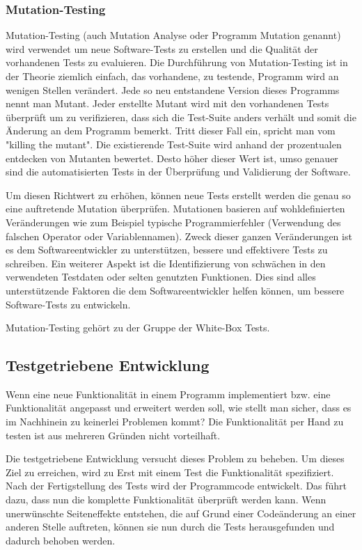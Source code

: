 \subsubsection{Mutation-Testing}

Mutation-Testing (auch Mutation Analyse oder Programm Mutation genannt) wird verwendet um neue Software-Tests zu erstellen und die Qualität der vorhandenen Tests zu evaluieren. Die Durchführung von Mutation-Testing ist in der Theorie ziemlich einfach, das vorhandene, zu testende, Programm wird an wenigen Stellen verändert. Jede so neu entstandene Version dieses Programms nennt man Mutant. Jeder erstellte Mutant wird mit den vorhandenen Tests überprüft um zu verifizieren, dass sich die Test-Suite anders verhält und somit die Änderung an dem Programm bemerkt. Tritt dieser Fall ein, spricht man vom "killing the mutant". Die existierende Test-Suite wird anhand der prozentualen entdecken von Mutanten bewertet. Desto höher dieser Wert ist, umso genauer sind die automatisierten Tests in der Überprüfung und Validierung der Software. 

Um diesen Richtwert zu erhöhen, können neue Tests erstellt werden die genau so eine auftretende Mutation überprüfen. Mutationen basieren auf wohldefinierten Veränderungen wie zum Beispiel typische Programmierfehler (Verwendung des falschen Operator oder Variablennamen). Zweck dieser ganzen Veränderungen ist es dem Softwareentwickler zu unterstützen, bessere und effektivere Tests zu schreiben. Ein weiterer Aspekt ist die Identifizierung von schwächen in den verwendeten Testdaten oder selten genutzten Funktionen. Dies sind alles unterstützende Faktoren die dem Softwareentwickler helfen können, um bessere Software-Tests zu entwickeln.

Mutation-Testing gehört zu der Gruppe der White-Box Tests.

\subsection{Testgetriebene Entwicklung}
Wenn eine neue Funktionalität in einem Programm implementiert bzw. eine Funktionalität angepasst und erweitert werden soll, wie stellt man sicher, dass es im Nachhinein
zu keinerlei Problemen kommt? Die Funktionalität per Hand zu testen ist aus mehreren Gründen nicht vorteilhaft.

Die testgetriebene Entwicklung versucht dieses Problem zu beheben. Um dieses Ziel zu erreichen, wird zu Erst mit einem Test die Funktionalität spezifiziert. Nach der
Fertigstellung des Tests wird der Programmcode entwickelt. Das führt dazu, dass nun die komplette Funktionalität überprüft werden kann. Wenn unerwünschte Seiteneffekte 
entstehen, die auf Grund einer Codeänderung an einer anderen Stelle auftreten, können sie nun durch die Tests herausgefunden und dadurch
behoben werden.

